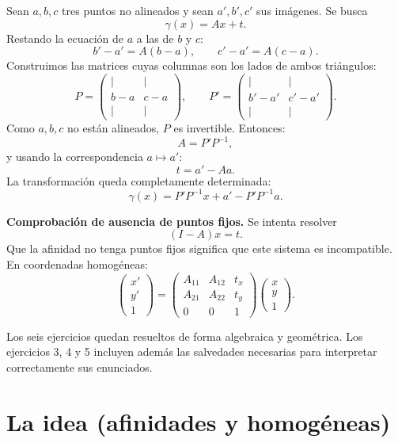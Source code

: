 Sean \(a,b,c\) tres puntos no alineados y sean \(a',b',c'\) sus imágenes. Se busca
\[
  \gamma(x)=Ax+t.
\]
Restando la ecuación de \(a\) a las de \(b\) y \(c\):
\[
  b'-a'=A(b-a),
  \qquad
  c'-a'=A(c-a).
\]
Construimos las matrices cuyas columnas son los lados de ambos triángulos:
\[
  P=
  \begin{pmatrix}\vert&\vert\\b-a&c-a\\\vert&\vert\end{pmatrix},
  \qquad
  P'=
  \begin{pmatrix}\vert&\vert\\b'-a'&c'-a'\\\vert&\vert\end{pmatrix}.
\]
Como \(a,b,c\) no están alineados, \(P\) es invertible. Entonces:
\[
  \boxed{A=P'P^{-1}},
\]
y usando la correspondencia \(a\mapsto a'\):
\[
  \boxed{t=a'-Aa}.
\]
La transformación queda completamente determinada:
\[
  \boxed{\gamma(x)=P'P^{-1}x+a'-P'P^{-1}a}.
\]

\textbf{Comprobación de ausencia de puntos fijos.} Se intenta resolver
\[
  (I-A)x=t.
\]
Que la afinidad no tenga puntos fijos significa que este sistema es incompatible. En
coordenadas homogéneas:
\[
\begin{pmatrix}x'\\y'\\1\end{pmatrix}
=
\begin{pmatrix}
A_{11}&A_{12}&t_x\\
A_{21}&A_{22}&t_y\\
0&0&1
\end{pmatrix}
\begin{pmatrix}x\\y\\1\end{pmatrix}.
\]

\begin{resultado}
Los seis ejercicios quedan resueltos de forma algebraica y geométrica. Los ejercicios 3, 4
y 5 incluyen además las salvedades necesarias para interpretar correctamente sus enunciados.
\end{resultado}



\section{La idea (afinidades y homogéneas)}

